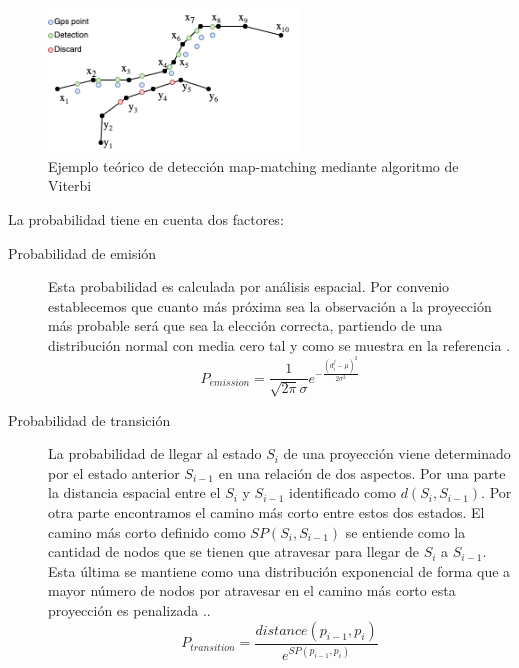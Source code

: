 \begin{figure}[htb]
\begin{center}
\includegraphics[width=0.6\textwidth]{./Imagenes/Map-matching.png}
\caption{Ejemplo teórico de detección map-matching mediante algoritmo de Viterbi}
\label{figure: MapMatching}
\end{center}
\end{figure}
\newpage

La probabilidad tiene en cuenta dos factores:
\begin{description}
\item [Probabilidad de emisión] Esta probabilidad es calculada por análisis espacial. Por convenio 
establecemos que cuanto más próxima sea la observación a la proyección más probable será que 
sea la elección correcta, partiendo de una distribución normal con media cero tal y como se 
muestra en la referencia \cite{HMM01}.
\begin{equation}
P_{emission}=\frac{1}{\sqrt{2\pi}\sigma}e^{-\frac{(d_{i}^{j}-\mu)^{2}}{2\sigma^{2}}} 
\end{equation}

\item [Probabilidad de transición] La probabilidad de llegar al estado $S_{i}$ de una proyección 
viene determinado por el estado anterior $S_{i-1}$ en una relación de dos aspectos. Por una parte 
la distancia espacial entre el  $S_{i}$ y $S_{i-1}$ identificado como $d(S_{i},S_{i-1})$. Por otra 
parte encontramos el camino más corto entre estos dos estados. El camino más corto definido 
como $SP(S_{i},S_{i-1})$ se entiende como la cantidad de nodos que se tienen que atravesar para 
llegar de  $S_{i}$ a $S_{i-1}$. Esta última se mantiene como una distribución exponencial de forma 
que a mayor número de nodos por atravesar en el camino más corto esta proyección es 
penalizada \cite{HMM01}..
\begin{equation} 
P_{transition}=\frac{distance(p_{i-1}, p_{i})}{e^{SP(p_{i-1}, p_{i})}}
\end{equation}
\end{description}

